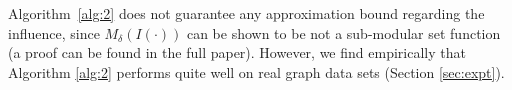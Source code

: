Algorithm~\ref{alg:2}  does not guarantee any approximation bound regarding the influence, since $M_{\delta}(I(\cdot))$
can be shown to be not a sub-modular set function\cite{zhang:kdd14} (a proof can be found in the full paper).
However, we find empirically that Algorithm \ref{alg:2} performs quite well on real graph data sets (Section \ref{sec:expt}).
%
%


